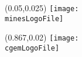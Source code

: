 \documentclass[dark]{cgem-presentation}
\begin{document}
  \begin{frame}[plain]
    \begin{figure}
      \begin{textblock*}{1cm}(0.05\paperwidth,0.025\paperheight)
        \texttt{[image: \\minesLogoFile]}
      \end{textblock*}
    \end{figure}
    \begin{figure}
      \begin{textblock*}{1cm}(0.867\paperwidth,0.02\paperheight)
        \texttt{[image: \\cgemLogoFile]}
      \end{textblock*}
    \end{figure}
    \makequestion{-8mm}{-2mm}{1.75cm}{1.82cm}{1mm}
  \end{frame}

  \BibliographyFrame
  \VariableFrame
\end{document}
